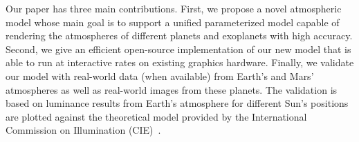 \documentclass[journal]{vgtc}                %
\newcommand{\anderscomment}[1]{\textbf{[AY~} \textcolor{cyan}{#1} \textbf{~]}}
\newcommand{\review}[1]{{\color{blue}#1}}
\begin{document}
Our paper has three main contributions. First, we propose a novel atmospheric model whose main goal is to support a unified parameterized model capable of rendering the atmospheres of different planets and exoplanets with high accuracy. Second, we give an efficient open-source implementation of our new model that is able to run at interactive rates on existing graphics hardware. Finally, we validate our model with real-world data (\review{when} available) from Earth's and Mars' atmospheres as well as real-world images from these planets. The validation is based on luminance results from Earth's atmosphere for different Sun's positions are plotted against the theoretical model provided by the International Commission on Illumination (CIE)~\cite{Darula:2002}. 
\end{document}
